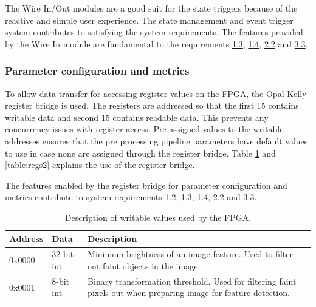 \documentclass[12pt]{report}
\begin{document}
The Wire In/Out modules are a good suit for the state triggers because of the reactive and simple user experience.
The state management and event trigger system contributes to satisfying the system requirements. The features provided by the Wire In module are fundamental to the requirements \hyperref[req1.3]{1.3}, \hyperref[req1.4]{1.4}, \hyperref[req2.2]{2.2} and \hyperref[req3.3]{3.3}.

\subsubsection{Parameter configuration and metrics}
To allow data transfer for accessing register values on the FPGA, the Opal Kelly register bridge is used. The registers are addressed so that the first 15 contains writable data and second 15 contains readable data. This prevents any concurrency issues with register access. Pre assigned values to the writable addresses ensures that the pre processing pipeline parameters have default values to use in case none are assigned through the register bridge. Table \ref{table:regs1} and \ref{table:regs2} explains the use of the register bridge. 
\par
The features enabled by the register bridge for parameter configuration and metrics contribute to system requirements \hyperref[req1.2]{1.2}, \hyperref[req1.3]{1.3}, \hyperref[req1.4]{1.4}, \hyperref[req2.2]{2.2} and \hyperref[req3.3]{3.3}.

\begin{table}[h]
    \begin{tabular}{|p{2cm}|p{2cm}|p{9cm}|}
        \hline
        \textbf{Address}&\textbf{Data}&\textbf{Description}\\
        \hline
        0x0000&32-bit int&Minimum brightness of an image feature. Used to filter out faint objects in the image.\\
        \hline
        0x0001&8-bit int&Binary transformation threshold. Used for filtering faint pixels out when preparing image for feature detection.\\ 
        \hline
    \end{tabular}
    \caption{Description of writable values used by the FPGA.}
    \label{table:regs1}
\end{table}
\end{document}
